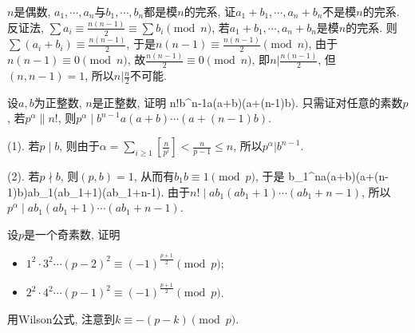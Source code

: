 \bq{}{}
$n$是偶数, $a_1, \cdots, a_n$与$b_1,\cdots, b_n$都是模$n$的完系, 证$a_1+b_1,\cdots, a_n+b_n$不是模$n$的完系.
\eq
\ba
反证法, $\sum a_i\equiv\frac{n(n-1)}{2}\equiv\sum b_i\pmod{n}$, 若$a_1+b_1,\cdots, a_n+b_n$是模$n$的完系.
则$\sum (a_i+b_i)\equiv\frac{n(n-1)}{2}$, 于是$n(n-1)\equiv\frac{n(n-1)}{2}\pmod{n}$, 由于$n(n-1)\equiv0\pmod{n}$,
故$\frac{n(n-1)}{2}\equiv0\pmod{n}$, 即$n\vert\frac{n(n-1)}{2}$, 但$(n,n-1)=1$, 所以$n\lvert\frac{n}{2}$不可能.
\ea

\bq{}{}
设$a,b$为正整数, $n$是正整数, 证明
\bee
n!\mid b^{n-1}a(a+b)\cdots(a+(n-1)b).
\eee
\eq
\ba
只需证对任意的素数$p$, 若$p^{\alpha}\| n!$, 则$p^{\alpha}\mid b^{n-1}a(a+b)\cdots(a+(n-1)b)$.

(1). 若$p\mid b$, 则由于$\alpha=\sum_{i\ge1}\left[\frac{n}{p^i}\right]<\frac{n}{p-1}\le n$, 所以$p^{\alpha}|b^{n-1}$.

(2). 若$p\nmid b$, 则$(p,b)=1$,  从而有$b_1b\equiv 1\pmod{p}$, 于是
\bee
b_{1}^{n}a(a+b)\cdots(a+(n-1)b)\equiv ab_1(ab_1+1)\cdots(ab_1+n-1).
\eee
由于$n!\mid ab_1(ab_1+1)\cdots(ab_1+n-1)$, 所以$p^{\alpha}\mid ab_1(ab_1+1)\cdots(ab_1+n-1)$.
\ea

\bq{}{}
设$p$是一个奇素数, 证明
\begin{itemize}
 \item $1^2\cdot3^2\cdots(p-2)^2\equiv(-1)^{\frac{p+1}{2}}\pmod{p}$;
 \item $2^2\cdot4^2\cdots(p-1)^2\equiv(-1)^{\frac{p+1}{2}}\pmod{p}$.
\end{itemize}
\eq
\ba
用Wilson公式, 注意到$k\equiv -(p-k)\pmod{p}$.
\ea
